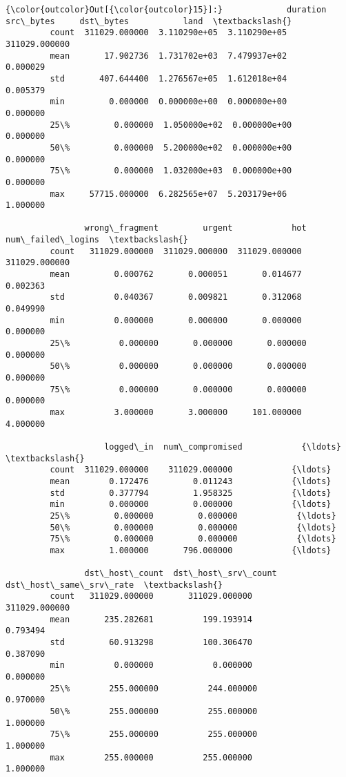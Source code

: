 \documentclass[11pt]{article}
\begin{document}
\begin{Verbatim}[commandchars=\\\{\}]
{\color{outcolor}Out[{\color{outcolor}15}]:}             duration     src\_bytes     dst\_bytes           land  \textbackslash{}
         count  311029.000000  3.110290e+05  3.110290e+05  311029.000000   
         mean       17.902736  1.731702e+03  7.479937e+02       0.000029   
         std       407.644400  1.276567e+05  1.612018e+04       0.005379   
         min         0.000000  0.000000e+00  0.000000e+00       0.000000   
         25\%         0.000000  1.050000e+02  0.000000e+00       0.000000   
         50\%         0.000000  5.200000e+02  0.000000e+00       0.000000   
         75\%         0.000000  1.032000e+03  0.000000e+00       0.000000   
         max     57715.000000  6.282565e+07  5.203179e+06       1.000000   
         
                wrong\_fragment         urgent            hot  num\_failed\_logins  \textbackslash{}
         count   311029.000000  311029.000000  311029.000000      311029.000000   
         mean         0.000762       0.000051       0.014677           0.002363   
         std          0.040367       0.009821       0.312068           0.049990   
         min          0.000000       0.000000       0.000000           0.000000   
         25\%          0.000000       0.000000       0.000000           0.000000   
         50\%          0.000000       0.000000       0.000000           0.000000   
         75\%          0.000000       0.000000       0.000000           0.000000   
         max          3.000000       3.000000     101.000000           4.000000   
         
                    logged\_in  num\_compromised            {\ldots}             \textbackslash{}
         count  311029.000000    311029.000000            {\ldots}              
         mean        0.172476         0.011243            {\ldots}              
         std         0.377794         1.958325            {\ldots}              
         min         0.000000         0.000000            {\ldots}              
         25\%         0.000000         0.000000            {\ldots}              
         50\%         0.000000         0.000000            {\ldots}              
         75\%         0.000000         0.000000            {\ldots}              
         max         1.000000       796.000000            {\ldots}              
         
                dst\_host\_count  dst\_host\_srv\_count  dst\_host\_same\_srv\_rate  \textbackslash{}
         count   311029.000000       311029.000000           311029.000000   
         mean       235.282681          199.193914                0.793494   
         std         60.913298          100.306470                0.387090   
         min          0.000000            0.000000                0.000000   
         25\%        255.000000          244.000000                0.970000   
         50\%        255.000000          255.000000                1.000000   
         75\%        255.000000          255.000000                1.000000   
         max        255.000000          255.000000                1.000000   
         

\end{Verbatim}
\end{document}
